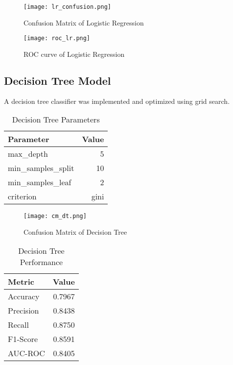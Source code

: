 \documentclass[12pt]{article}
\begin{document}
\begin{figure}[H]
    \centering
    \texttt{[image: lr\_confusion.png]}
    \caption{Confusion Matrix of Logistic Regression}
    \label{fig:example}
\end{figure}

\begin{figure}[H]
    \centering
    \texttt{[image: roc\_lr.png]}
    \caption{ROC curve of Logistic Regression}
    \label{fig:example}
\end{figure}

\subsection{Decision Tree Model}
A decision tree classifier was implemented and optimized using grid search.

\begin{table}[H]
\centering
\caption{Decision Tree Parameters}
\label{tab:dt_params}
\begin{tabular}{lr}
\toprule
\textbf{Parameter} & \textbf{Value} \\
\midrule
max\_depth & 5 \\
min\_samples\_split & 10 \\
min\_samples\_leaf & 2 \\
criterion & gini \\
\bottomrule
\end{tabular}
\end{table}

\begin{figure}[H]
    \centering
    \texttt{[image: cm\_dt.png]}
    \caption{Confusion Matrix of Decision Tree}
    \label{fig:example}
\end{figure}


\begin{table}[H]
\centering
\caption{Decision Tree Performance}
\label{tab:dt_perf}
\begin{tabular}{lr}
\toprule
\textbf{Metric} & \textbf{Value} \\
\midrule
Accuracy & 0.7967 \\
Precision & 0.8438 \\
Recall & 0.8750 \\
F1-Score & 0.8591 \\
AUC-ROC & 0.8405 \\
\bottomrule
\end{tabular}
\end{table}
\end{document}
